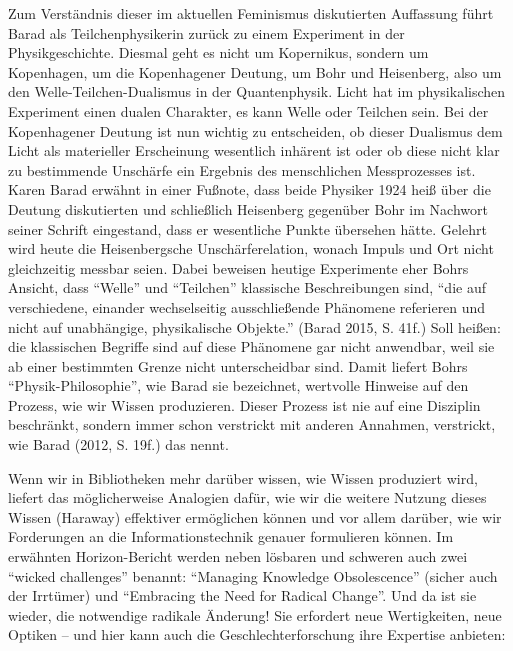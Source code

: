Zum Verständnis dieser im aktuellen Feminismus diskutierten Auffassung
führt Barad als Teilchenphysikerin zurück zu einem Experiment in der
Physikgeschichte. Diesmal geht es nicht um Kopernikus, sondern um
Kopenhagen, um die Kopenhagener Deutung, um Bohr und Heisenberg, also um
den Welle-Teilchen-Dualismus in der Quantenphysik. Licht hat im
physikalischen Experiment einen dualen Charakter, es kann Welle oder
Teilchen sein. Bei der Kopenhagener Deutung ist nun wichtig zu
entscheiden, ob dieser Dualismus dem Licht als materieller Erscheinung
wesentlich inhärent ist oder ob diese nicht klar zu bestimmende
Unschärfe ein Ergebnis des menschlichen Messprozesses ist. Karen Barad
erwähnt in einer Fußnote, dass beide Physiker 1924 heiß über die Deutung
diskutierten und schließlich Heisenberg gegenüber Bohr im Nachwort
seiner Schrift eingestand, dass er wesentliche Punkte übersehen hätte.
Gelehrt wird heute die Heisenbergsche Unschärferelation, wonach Impuls
und Ort nicht gleichzeitig messbar seien. Dabei beweisen heutige
Experimente eher Bohrs Ansicht, dass \enquote{Welle} und
\enquote{Teilchen} klassische Beschreibungen sind, \enquote{die auf
verschiedene, einander wechselseitig ausschließende Phänomene referieren
und nicht auf unabhängige, physikalische Objekte.} (Barad 2015, S. 41f.)
Soll heißen: die klassischen Begriffe sind auf diese Phänomene gar nicht
anwendbar, weil sie ab einer bestimmten Grenze nicht unterscheidbar
sind. Damit liefert Bohrs \enquote{Physik-Philosophie}, wie Barad sie
bezeichnet, wertvolle Hinweise auf den Prozess, wie wir Wissen
produzieren. Dieser Prozess ist nie auf eine Disziplin beschränkt,
sondern immer schon verstrickt mit anderen Annahmen, verstrickt, wie
Barad (2012, S. 19f.) das nennt.

Wenn wir in Bibliotheken mehr darüber wissen, wie Wissen produziert
wird, liefert das möglicherweise Analogien dafür, wie wir die weitere
Nutzung dieses Wissen (Haraway) effektiver ermöglichen können und vor
allem darüber, wie wir Forderungen an die Informationstechnik genauer
formulieren können. Im erwähnten Horizon-Bericht werden neben lösbaren
und schweren auch zwei \enquote{wicked challenges} benannt:
\enquote{Managing Knowledge Obsolescence} (sicher auch der Irrtümer) und
\enquote{Embracing the Need for Radical Change}. Und da ist sie wieder,
die notwendige radikale Änderung! Sie erfordert neue Wertigkeiten, neue
Optiken -- und hier kann auch die Geschlechterforschung ihre Expertise
anbieten:

